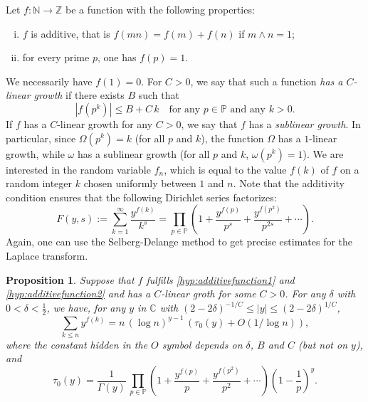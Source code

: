 \documentclass[12pt,a4paper,reqno]{amsart}
\newtheorem{proposition}[lemma]{Proposition}
\theoremstyle{remark}
\newcommand{\N}{\mathbb{N}}
\newcommand{\Z}{\mathbb{Z}}
\newcommand{\C}{\mathbb{C}}
\begin{document}
Let $f: \N \to \Z$ be a function with the following properties:\vspace{2mm}
\begin{enumerate}[(i)]
\item\label{hyp:additivefunction1} $f$ is additive, that is $f(mn)=f(m)+f(n)$ if $m \wedge n =1$;\vspace{2mm}
\item\label{hyp:additivefunction2} for every prime $p$, one has $f(p)=1$.\vspace{2mm}
\end{enumerate}
We necessarily have $f(1)=0$. For $C>0$, we say that such a function {\em has a $C$-linear growth} if there exists $B$ such that
$$|f(p^k)| \le B+C\, k \quad\text{for any }p\in \mathbb{P} \text{ and any }k>0.$$
If $f$ has a $C$-linear growth for any $C>0$, we say that $f$ has a {\em sublinear growth}. In particular, since $\Omega(p^k)=k$ (for all $p$ and $k$), the function $\Omega$ has a $1$-linear growth, while $\omega$ has a sublinear growth (for all $p$ and $k$, $\omega(p^k)=1$). We are interested in the random variable $f_n$, which is equal to the value $f(k)$ of $f$ on a random integer $k$ chosen uniformly between $1$ and $n$. Note that the additivity condition ensures that the following Dirichlet series factorizes:
\[F(y,s):= \sum_{k=1}^\infty \frac{y^{f(k)}}{k^s} = \prod_{p\in \mathbb{P}} \left( 1+\frac{y^{f(p)}}{p^s}+\frac{y^{f(p^2)}}{p^{2s}}+\cdots \right). \]
Again, one can use the Selberg-Delange method to get precise estimates for the Laplace transform.
\begin{proposition}
\label{prop:selbergdelange_general}
Suppose that $f$ fulfills \eqref{hyp:additivefunction1} and \eqref{hyp:additivefunction2} and has a $C$-linear groth for some $C>0$. For any $\delta$ with $0<\delta<\frac{1}{2}$, we have, for any $y$ in $\C$ with $(2-2\delta)^{-1/C} \le |y| \le (2-2\delta)^{1/C}$,
\begin{equation}
 \sum_{k \le n} y^{f(k)} = n\, (\log n)^{y-1} \, (\tau_0(y) +O(1/\log n)),
\label{eq:asymptotics_generaladditivefunction}
\end{equation}
where the constant hidden in the $O$ symbol depends on $\delta$, $B$ and $C$ (but not on $y$), and
\[\tau_0(y)= \frac{1}{\Gamma(y)} \, \prod_{p \in \mathbb{P}}
\left( 1 + \frac{y^{f(p)}}{p}+\frac{y^{f(p^2)}}{p^2} + \cdots \right)\left( 1- \frac{1}{p} \right)^y. \]
\end{proposition}
\end{document}
